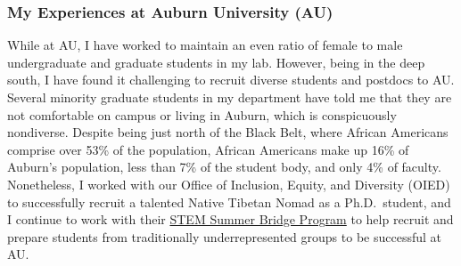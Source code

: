 \subsubsection*{My Experiences at Auburn University (AU)}
While at AU, I have worked to maintain an even ratio of female to male
undergraduate and graduate students in my lab.
However, being in the deep south, I have found it challenging to recruit
diverse students and postdocs to AU.
Several minority graduate students in my department have told me that they are
not comfortable on campus or living in Auburn, which is conspicuously
nondiverse.
Despite being just north of the Black Belt,
where African Americans comprise over 53\% of the population,
African Americans make up
16\% of Auburn's population, less than 7\% of the student body,
and only 4\% of faculty.
Nonetheless, I worked with
our Office of Inclusion, Equity, and Diversity (OIED) to successfully recruit a
talented Native Tibetan Nomad as a Ph.D.\ student,
and I continue to work with their
\href{https://www.auburn.edu/cosam/departments/diversity/summerbridge/index.htm}{STEM Summer Bridge Program}
to help recruit and prepare students from traditionally underrepresented groups
to be successful at AU.


